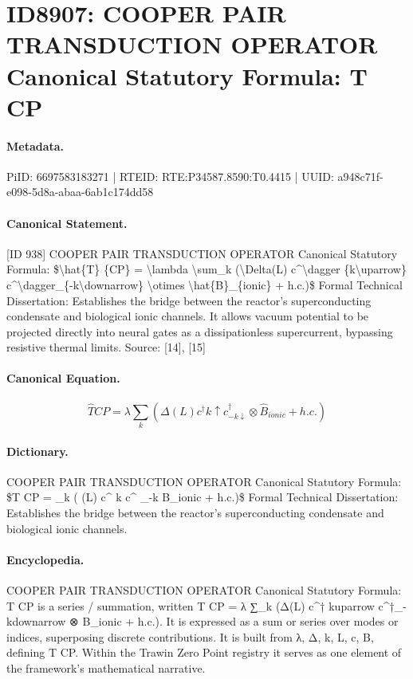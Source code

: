 \section*{ID8907: COOPER PAIR TRANSDUCTION OPERATOR Canonical Statutory Formula: T CP}
\paragraph{Metadata.}
PiID: 6697583183271 | RTEID: RTE:P34587.8590:T0.4415 | UUID: a948c71f-e098-5d8a-abaa-6ab1c174dd58

\paragraph{Canonical Statement.}
[ID 938] COOPER PAIR TRANSDUCTION OPERATOR Canonical Statutory Formula: \$\textbackslash{}hat\{T\} \{CP\} = \textbackslash{}lambda \textbackslash{}sum\_k (\textbackslash{}Delta(L) c\textasciicircum{}\textbackslash{}dagger \{k\textbackslash{}uparrow\} c\textasciicircum{}\textbackslash{}dagger\_\{-k\textbackslash{}downarrow\} \textbackslash{}otimes \textbackslash{}hat\{B\}\_\{ionic\} + h.c.)\$ Formal Technical Dissertation: Establishes the bridge between the reactor's superconducting condensate and biological ionic channels. It allows vacuum potential to be projected directly into neural gates as a dissipationless supercurrent, bypassing resistive thermal limits. Source: [14], [15]

\paragraph{Canonical Equation.}
\[
\hat{T} {CP} = \lambda \sum_k (\Delta(L) c^\dagger {k\uparrow} c^\dagger_{-k\downarrow} \otimes \hat{B}_{ionic} + h.c.)
\]

\paragraph{Dictionary.}
COOPER PAIR TRANSDUCTION OPERATOR Canonical Statutory Formula: \$T CP = \_k ( (L) c\textasciicircum{} k c\textasciicircum{} \_-k B\_ionic + h.c.)\$ Formal Technical Dissertation: Establishes the bridge between the reactor's superconducting condensate and biological ionic channels.

\paragraph{Encyclopedia.}
COOPER PAIR TRANSDUCTION OPERATOR Canonical Statutory Formula: T CP is a series / summation, written T CP = λ ∑\_k (Δ(L) c\textasciicircum{}† kuparrow c\textasciicircum{}†\_-kdownarrow ⊗ B\_ionic + h.c.). It is expressed as a sum or series over modes or indices, superposing discrete contributions. It is built from λ, Δ, k, L, c, B, defining T CP. Within the Trawin Zero Point registry it serves as one element of the framework's mathematical narrative.
